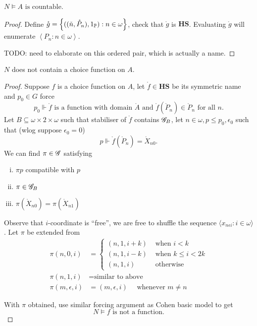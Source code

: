 \begin{lemma}
    \(N\models A\text{ is countable}\).
\end{lemma}
\begin{proof}
  Define \(\mathring{g} = {\left\{ ((\check{n}, \mathring{P}_n), 1_{\mathbb{P}}): n\in\omega \right\}}\), check that \(\mathring{g}\) is \(\mathbf{HS}\).
  Evaluating \(\mathring{g}\) will enumerate \(\left\langle P_n: n\in\omega\right\rangle\).

  TODO: need to elaborate on this ordered pair, which is actually a name.
\end{proof}

\begin{theorem}
    \(N\) does not contain a choice function on \(A\).
\end{theorem}
\begin{proof}
Suppose \(f\) is a choice function on \(A\), let \(\mathring{f}\in\mathbf{HS}\) be its symmetric name and \(p_0\in G\) force
\[p_0\Vdash \mathring{f}\text{ is a function with domain } \mathring{A} \text{ and } \mathring{f}(\mathring{P}_n) \in \mathring{P}_n\text{ for all }n .\]
Let \(B\subseteq \omega\times2\times\omega\) such that stabiliser of \(\mathring{f}\) contains \(\mathscr{G}_B\),
let \(n\in\omega, p\leq p_0, \epsilon_0\) such that (wlog suppose \(\epsilon_0 = 0\))
\[ p\Vdash \mathring{f}(\mathring{P}_n) = \mathring{X}_{n0}. \]
We can find \(\pi\in\mathscr{G}\) satisfying
\begin{enumerate}[i.]
    \item \(\pi p\) compatible with \(p\)
    \item \(\pi \in \mathscr{G}_B\)
    \item \(\pi(\mathring{X}_{n0}) = \pi(\mathring{X}_{n1})\)
\end{enumerate}
Observe that \(i\)-coordinate is ``free'',
we are free to shuffle the sequence \(\langle x_{n\epsilon i}:i\in\omega\rangle\).
Let \(\pi\) be extended from
\begin{align*}
    \pi(n,0,i) &=
    \begin{cases}
        (n,1,i+k) &\text{ when } i < k \\
        (n,1,i-k) &\text{ when } k \leq i < 2k \\
        (n,1,i) &\text{ otherwise}
    \end{cases} \\
    \pi(n,1,i) &= \text{similar to above} \\
    \pi(m,\epsilon,i) &= (m,\epsilon,i) \quad\text{ whenever }m \ne n
\end{align*}

With \(\pi\) obtained, use similar forcing argument as Cohen basic model to get
\[ N\models f\text{ is not a function}.\]
\end{proof}
